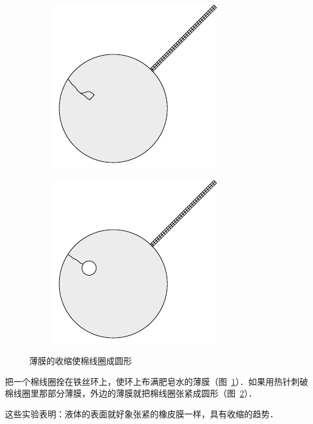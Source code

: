 \begin{figure}[htbp]
    \centering
    \begin{subfigure}{0.43\linewidth}
        \centering
        \includegraphics{fig/B/4-10a.pdf}
        \caption{}\label{fig_B_4-10a}
    \end{subfigure}
    \hfil
    \begin{subfigure}{0.43\linewidth}
        \centering
        \includegraphics{fig/B/4-10b.pdf}
        \caption{}\label{fig_B_4-10b}
    \end{subfigure}
    \caption{薄膜的收缩使棉线圈成圆形}\label{fig_B_4-10}
\end{figure}

把一个棉线圈拴在铁丝环上，使环上布满肥皂水的薄膜（图~\ref{fig_B_4-10a}）．如果用热针刺破棉线圈里那部分薄膜，外边的薄膜就把棉线圈张紧成圆形（图~\ref{fig_B_4-10b}）．

这些实验表明：液体的表面就好象张紧的橡皮膜一样，具有收缩的趋势．

